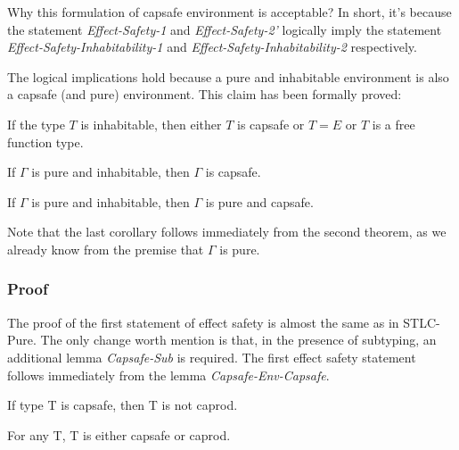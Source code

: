 Why this formulation of capsafe environment is acceptable? In short,
it's because the statement \emph{Effect-Safety-1} and
\emph{Effect-Safety-2'} logically imply the statement
\emph{Effect-Safety-Inhabitability-1} and
\emph{Effect-Safety-Inhabitability-2} respectively.

The logical implications hold because a pure and inhabitable
environment is also a capsafe (and pure) environment. This claim has
been formally proved:

\begin{lemma}
  If the type $T$ is inhabitable, then either $T$ is capsafe or
  $T = E$ or $T$ is a free function type.
\end{lemma}

\begin{theorem}
  If $\Gamma$ is pure and inhabitable, then $\Gamma$ is capsafe.
\end{theorem}

\begin{corollary}
  If $\Gamma$ is pure and inhabitable, then $\Gamma$ is pure and
  capsafe.
\end{corollary}

Note that the last corollary follows immediately from the second
theorem, as we already know from the premise that $\Gamma$ is pure.


\subsubsection{Proof}

The proof of the first statement of effect safety is almost the same
as in STLC-Pure. The only change worth mention is that, in the
presence of subtyping, an additional lemma \emph{Capsafe-Sub} is
required.  The first effect safety statement follows immediately from
the lemma \emph{Capsafe-Env-Capsafe}.

\begin{lemma}
 If type T is capsafe, then T is not caprod.
\end{lemma}

\begin{lemma}
 For any T, T is either capsafe or caprod.
\end{lemma}

